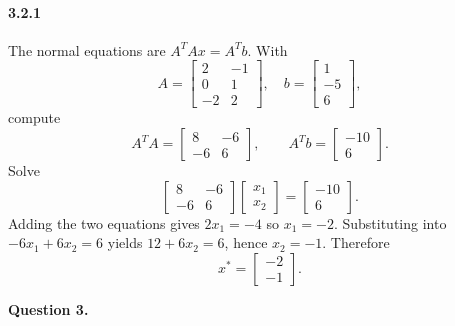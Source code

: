 \documentclass[11pt]{article}
\begin{document}
\paragraph{3.2.1}
The normal equations are \(A^{T}A x = A^{T}b\). With
\[
A=\begin{bmatrix}2&-1\\0&1\\-2&2\end{bmatrix},\quad
b=\begin{bmatrix}1\\-5\\6\end{bmatrix},
\]
compute
\[
A^{T}A=
\begin{bmatrix}
8&-6\\
-6&6
\end{bmatrix},
\qquad
A^{T}b=
\begin{bmatrix}
-10\\
6
\end{bmatrix}.
\]
Solve
\[
\begin{bmatrix}
8&-6\\
-6&6
\end{bmatrix}
\begin{bmatrix}x_1\\x_2\end{bmatrix}
=
\begin{bmatrix}-10\\6\end{bmatrix}.
\]
Adding the two equations gives \(2x_1=-4\) so \(x_1=-2\). Substituting into \(-6x_1+6x_2=6\) yields \(12+6x_2=6\), hence \(x_2=-1\). Therefore
\[
x^{\ast}=\begin{bmatrix}-2\\-1\end{bmatrix}.
\]


\newpage



{\bf Question 3.}
\end{document}
